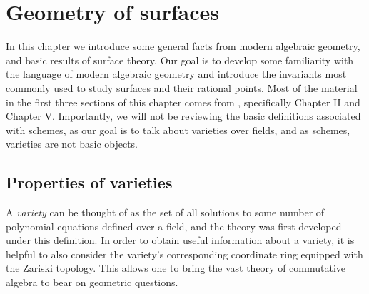 \documentclass[12pt,twoside]{reedthesis}
\theoremstyle{plain}
\theoremstyle{definition}
\theoremstyle{remark}
\begin{document}
\mainmatter 
\pagestyle{fancyplain} 
\chapter{Geometry of surfaces}
In this chapter we introduce some general facts from modern algebraic geometry, and basic results of surface theory. Our goal is to develop some familiarity with the language of modern algebraic geometry and introduce the invariants most commonly used to study surfaces and their rational points. Most of the material in the first three sections of this chapter comes from \cite{hartshorne}, specifically Chapter II and Chapter V. Importantly, we will not be reviewing the basic definitions associated with schemes, as our goal is to talk about varieties over fields, and as schemes, varieties are not basic objects.

\section{Properties of varieties}
A \emph{variety} can be thought of as the set of all solutions to some number of polynomial equations defined over a field, and the theory was first developed under this definition. In order to obtain useful information about a variety, it is helpful to also consider the variety's corresponding coordinate ring equipped with the Zariski topology. This allows one to bring the vast theory of commutative algebra to bear on geometric questions.
\end{document}
